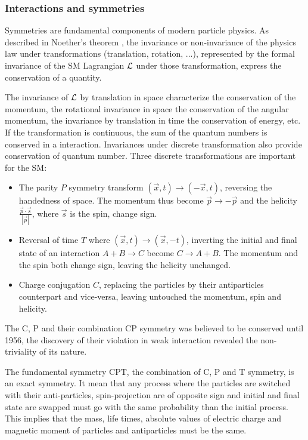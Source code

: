 \subsubsection{Interactions and symmetries}

Symmetries are fundamental components of modern particle physics. As described in Noether's theorem \cite{noether_invariant_1971}, the invariance or non-invariance of the physics law under transformations (translation, rotation, ...), represented by the formal invariance of the SM Lagrangian ${\cal L}$ under those transformation, express the conservation of a quantity.

The invariance of ${\cal L}$ by translation in space characterize the conservation of the momentum, the rotational invariance in space the conservation of the angular momentum, the invariance by translation in time the conservation of energy, etc. If the transformation is continuous, the sum of the quantum numbers is conserved in a interaction.
Invariances under discrete transformation also provide conservation of quantum number. Three discrete transformations are important for the SM:
\begin{itemize}
  \item The parity $P$ symmetry transform $(\vec{x}, t) \rightarrow (-\vec{x}, t)$, reversing the handedness of space. The momentum thus become $\vec{p} \rightarrow -\vec{p}$ and the helicity $\frac{\vec{p} \cdot \vec{s}}{|\vec{p}|}$, where $\vec{s}$ is the spin, change sign.

  \item Reversal of time $T$ where $(\vec{x}, t) \rightarrow (\vec{x}, -t)$, inverting the initial and final state of an interaction $A + B \rightarrow C$ become $C \rightarrow A + B$. The momentum and the spin both change sign, leaving the helicity unchanged.

  \item Charge conjugation $C$, replacing the particles by their antiparticles counterpart and vice-versa, leaving untouched the momentum, spin and helicity.
\end{itemize}

The C, P and their combination CP symmetry was believed to be conserved until 1956, the discovery of their violation \cite{lee_question_1956, wu_experimental_1957, christenson_evidence_1964} in weak interaction revealed the non-triviality of its nature.

The fundamental symmetry CPT, the combination of C, P and T symmetry, is an exact symmetry. It mean that any process where the particles are switched with their anti-particles, spin-projection are of opposite sign and initial and final state are swapped must go with the same probability than the initial process. This implies that the mass, life times, absolute values of electric charge and magnetic moment of particles and antiparticles must be the same.

